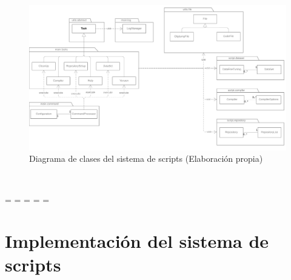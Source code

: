 
\begin{figure}[H]
    \begin{center}
        \includegraphics[scale=0.2]{figuras/Capitulo_XX/UML_Script.png}
    \end{center}
    \caption[Diagrama de clases del sistema de scripts]{Diagrama de clases del sistema de scripts (Elaboración propia)}
    \label{fig:UML_Script}
\end{figure}\

\newpage
\paperwidth=\pdfpageheight
\paperheight=\pdfpagewidth
\pdfpageheight=\paperheight
\pdfpagewidth=\paperwidth
\headwidth=\textwidth

\section{Implementación del sistema de scripts}
\label{sec:implementacion_sistema_scripts}

